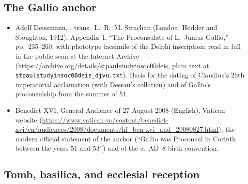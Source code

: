 \subsection*{The Gallio anchor}

\begin{itemize}
\item Adolf Deissmann, , trans.\ L.~R.~M. Strachan (London: Hodder and Stoughton, 1912),
Appendix~I, ``The Proconsulate of L.~Junius Gallio,'' pp.~235--260, with
phototype facsimile of the Delphi inscription; read in full in the
public scan at the Internet Archive
(\url{https://archive.org/details/stpaulstudyinsoc00deis}, plain text at
\texttt{stpaulstudyinsoc00deis\_djvu.txt}). Basis for the dating of
Claudius's 26th imperatorial acclamation (with Dessau's collation) and of
Gallio's proconsulship from the summer of 51.
\item Benedict XVI, General Audience of 27 August 2008 (English),
Vatican website
(\url{https://www.vatican.va/content/benedict-xvi/en/audiences/2008/documents/hf_ben-xvi_aud_20080827.html});
the modern official statement of the anchor (``Gallio was Proconsul in
Corinth between the years 51 and 53'') and of the c.~AD~8 birth
convention.
\end{itemize}

\subsection*{Tomb, basilica, and ecclesial reception}

